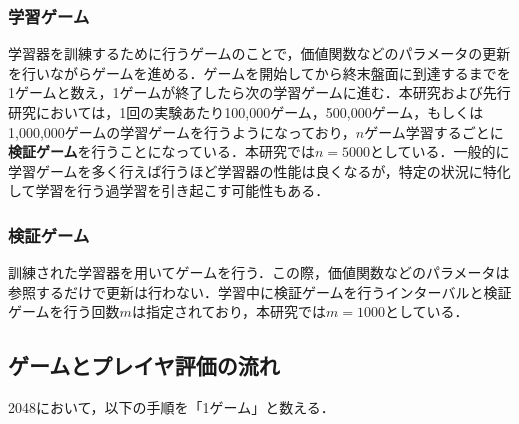 \documentclass{suribt}
\begin{document}
\subsubsection{学習ゲーム}
学習器を訓練するために行うゲームのことで，価値関数などのパラメータの更新を行いながらゲームを進める．ゲームを開始してから終末盤面に到達するまでを1ゲームと数え，1ゲームが終了したら次の学習ゲームに進む．本研究および先行研究においては，1回の実験あたり100,000ゲーム，500,000ゲーム，もしくは1,000,000ゲームの学習ゲームを行うようになっており，$n$ゲーム学習するごとに\textbf{検証ゲーム}を行うことになっている．本研究では$n=5000$としている．一般的に学習ゲームを多く行えば行うほど学習器の性能は良くなるが，特定の状況に特化して学習を行う過学習を引き起こす可能性もある．\cite{Yeh}

\subsubsection{検証ゲーム}
訓練された学習器を用いてゲームを行う．この際，価値関数などのパラメータは参照するだけで更新は行わない．学習中に検証ゲームを行うインターバルと検証ゲームを行う回数$m$は指定されており，本研究では$m=1000$としている．

\subsection{ゲームとプレイヤ評価の流れ}
2048において，以下の手順を「1ゲーム」と数える．
\end{document}
